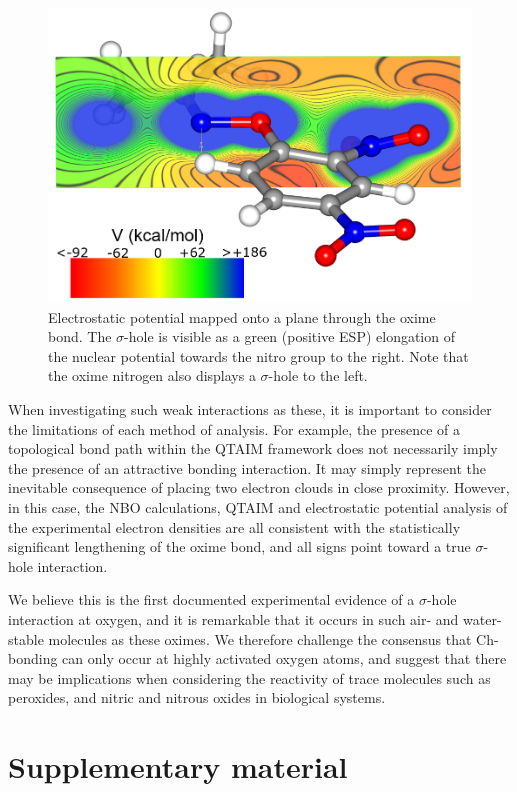 \begin{refsection}
\begin{figure}
	\centering
	\includegraphics[width=0.6\columnwidth]{Figures/acetone-oxime-dnp-esp.png}
	\caption{Electrostatic potential mapped onto a plane through the oxime bond. The $\sigma$-hole is visible as a green (positive ESP) elongation of the nuclear potential towards the nitro group to the right. Note that the oxime nitrogen also displays a $\sigma$-hole to the left.}
	\label{fig:acetone-esp}
\end{figure}

When investigating such weak interactions as these, it is important to consider the limitations of each method of analysis. 
For example, the presence of a topological bond path within the QTAIM framework does not necessarily imply the presence of an attractive bonding interaction.
It may simply represent the inevitable consequence of placing two electron clouds in close proximity.\autocite{Spackman1999,Gatti2005,Bader2009,Cerpa2008,Cerpa2009}
However, in this case, the NBO calculations, QTAIM and electrostatic potential analysis of the experimental electron densities are all consistent with the statistically significant lengthening of the oxime  bond, and all signs point toward a true $\sigma$-hole interaction.

We believe this is the first documented experimental evidence of a $\sigma$-hole interaction at oxygen, and it is remarkable that it occurs in such air- and water-stable molecules as these oximes.
We therefore challenge the consensus that Ch-bonding can only occur at highly activated oxygen atoms, and suggest that there may be implications when considering the reactivity of trace molecules such as peroxides, and nitric and nitrous oxides in biological systems.

\section{Supplementary material}


\end{refsection}
